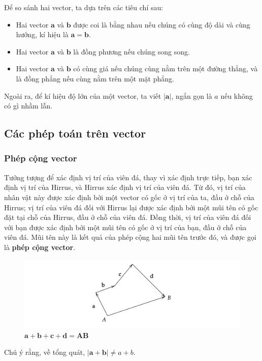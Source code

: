Để so sánh hai vector, ta dựa trên các tiêu chí sau:
    \begin{itemize}
        \item Hai vector \(\mathbf{a}\) và \(\mathbf{b}\) được coi là bằng nhau nếu chúng có cùng độ dài và cùng hướng, kí hiệu là \(\mathbf{a}=\mathbf{b}\).
        \item Hai vector \(\mathbf{a}\) và \(\mathbf{b}\) là đồng phương nếu chúng song song.
        \item Hai vector \(\mathbf{a}\) và \(\mathbf{b}\) có cùng giá nếu chúng cùng nằm trên một đường thẳng, và là đồng phẳng nếu cùng nằm trên một mặt phẳng.
    \end{itemize}

Ngoài ra, để kí hiệu độ lớn của một vector, ta viết \(\lvert \mathbf{a}\rvert\), ngắn gọn là \(a\) nếu không có gì nhầm lẫn.  
\subsection{Các phép toán trên vector}

\subsubsection{Phép cộng vector}
Tưởng tượng để xác định vị trí của viên đá, thay vì xác định trực tiếp, bạn xác định vị trí của Hirrus, và Hirrus xác định vị trí của viên đá. Từ đó, vị trí của nhân vật này được xác định bởi một vector có gốc ở vị trí của ta, đầu ở chỗ của Hirrus; vị trí của viên đá đối với Hirrus lại được xác định bởi một mũi tên có gốc đặt tại chỗ của Hirrus, đầu ở chỗ của viên đá. Đồng thời, vị trí của viên đá đối với bạn được xác định bởi một mũi tên có gốc ở vị trí của bạn, đầu ở chỗ của viên đá. Mũi tên này là kết quả của phép cộng hai mũi tên trước đó, và được gọi là \textbf{phép cộng vector}.
\begin{figure}[H]
    \centering
    \includegraphics[width=1\textwidth]{Tuan2/Figures/congvector.png}
    \caption{$\mathbf{a}+\mathbf{b}+\mathbf{c}+\mathbf{d}=\mathbf{AB}$}
\end{figure}
Chú ý rằng, về tổng quát, \(\lvert \mathbf{a}+\mathbf{b}\rvert\neq a+b\).
